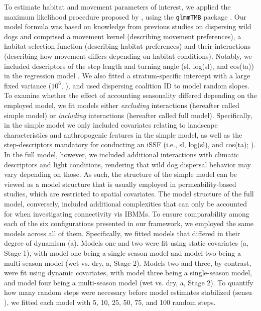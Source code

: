 \documentclass[abstract=on,10pt,a4paper,bibliography=totocnumbered]{article}
\begin{document}
To estimate habitat and movement parameters of interest, we applied the maximum
likelihood procedure proposed by \citet{Muff.2020}, using the \texttt{glmmTMB}
package \citep{Brooks.2017}. Our model formula was based on knowledge from
previous studies on dispersing wild dogs \citep{Hofmann.2021, Hofmann.2023} and
comprised a movement kernel (describing movement preferences), a
habitat-selection function (describing habitat preferences) and their
interactions (describing how movement differs depending on habitat conditions).
Notably, we included descriptors of the step length and turning angle (sl,
log(sl), and cos(ta)) in the regression model \citep{Avgar.2017, Fieberg.2021}.
We also fitted a stratum-specific intercept with a large fixed variance ($10^6$,
\citealp{Muff.2020}), and used dispersing coalition ID to model random slopes.
To examine whether the effect of accounting seasonality differed depending on
the employed model, we fit models either \textit{excluding} interactions
(hereafter called simple model) or \textit{including} interactions (hereafter
called full model). Specifically, in the simple model we only included
covariates relating to landscape characteristics and anthropogenic features in
the simple model, as well as the step-descriptors mandatory for conducting an
iSSF (i.e., sl, log(sl), and cos(ta); \citealp{Avgar.2016}). In the full model,
however, we included additional interactions with climatic descriptors and light
conditions, rendering that wild dog dispersal behavior may vary depending on
those. As such, the structure of the simple model can be viewed as a model
structure that is usually employed in permeability-based studies, which are
restricted to spatial covariates. The model structure of the full model,
conversely, included additional complexities that can only be accounted for when
investigating connectivity vis IBMMs. To ensure comparability among each of the
six configurations presented in our framework, we employed the same models
across all of them. Specifically, we fitted models that differed in their degree
of dynamism (a). Models one and two were fit using
static covariates (a, Stage 1), with model one being a
single-season model and model two being a multi-season model (wet vs. dry,
a, Stage 2). Models two and three, by contrast, were fit
using dynamic covariates, with model three being a single-season model, and
model four being a multi-season model (wet vs. dry, a,
Stage 2). To quantify how many random steps were necessary before model
estimates stabilized (sensu \citealp{Fieberg.2021}), we fitted each model with
5, 10, 25, 50, 75, and 100 random steps.
\end{document}
